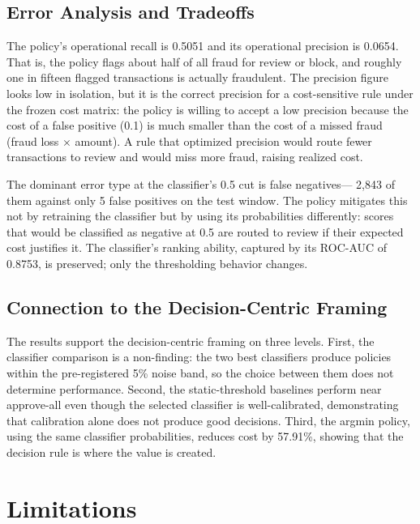 \documentclass[conference]{IEEEtran}
\begin{document}
\subsection{Error Analysis and Tradeoffs}

The policy's operational recall is 0.5051 and its operational precision is
0.0654. That is, the policy flags about half of all fraud for review or
block, and roughly one in fifteen flagged transactions is actually
fraudulent. The precision figure looks low in isolation, but it is the
correct precision for a cost-sensitive rule under the frozen cost matrix:
the policy is willing to accept a low precision because the cost of a false
positive (0.1) is much smaller than the cost of a missed fraud (fraud loss
$\times$ amount). A rule that optimized precision would route fewer
transactions to review and would miss more fraud, raising realized cost.

The dominant error type at the classifier's 0.5 cut is false negatives---
2,843 of them against only 5 false positives on the test window. The policy
mitigates this not by retraining the classifier but by using its
probabilities differently: scores that would be classified as negative at
0.5 are routed to review if their expected cost justifies it. The
classifier's ranking ability, captured by its ROC-AUC of 0.8753, is
preserved; only the thresholding behavior changes.

\subsection{Connection to the Decision-Centric Framing}

The results support the decision-centric framing on three levels. First,
the classifier comparison is a non-finding: the two best classifiers
produce policies within the pre-registered 5\% noise band, so the choice
between them does not determine performance. Second, the static-threshold
baselines perform near approve-all even though the selected classifier is
well-calibrated, demonstrating that calibration alone does not produce good
decisions. Third, the argmin policy, using the same classifier
probabilities, reduces cost by 57.91\%, showing that the decision rule is
where the value is created.

\section{Limitations}
\end{document}
